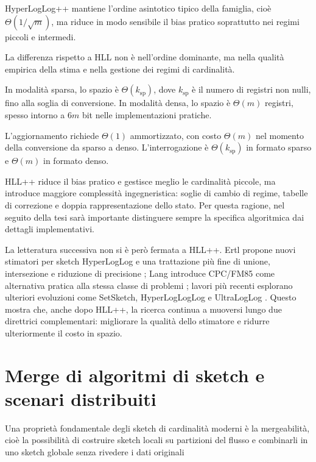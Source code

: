 HyperLogLog++ mantiene l'ordine asintotico tipico della famiglia, cioè
$\Theta(1/\sqrt{m})$, ma riduce in modo sensibile il bias pratico soprattutto
nei regimi piccoli e intermedi. 

La differenza rispetto a HLL non è nell'ordine
dominante, ma nella qualità empirica della stima e nella gestione dei regimi di
cardinalità.

In modalità sparsa, lo spazio è \(\Theta(k_{\text{sp}})\), dove $k_{\text{sp}}$ è il numero di registri non nulli,
fino alla soglia di conversione. In modalità densa, lo spazio è \(\Theta(m)\)
registri, spesso intorno a $6m$ bit nelle implementazioni pratiche.

L'aggiornamento richiede $\Theta(1)$ ammortizzato, con costo $\Theta(m)$ nel momento
della conversione da sparso a denso. L'interrogazione è
$\Theta(k_{\text{sp}})$ in formato sparso e $\Theta(m)$ in formato
denso.

HLL++ riduce il bias pratico e gestisce meglio le cardinalità piccole, ma
introduce maggiore complessità ingegneristica: soglie di cambio di regime,
tabelle di correzione e doppia rappresentazione dello stato. Per questa
ragione, nel seguito della tesi sarà importante distinguere sempre la specifica
algoritmica dai dettagli implementativi.

La letteratura successiva non si è però fermata a HLL++. Ertl propone nuovi
stimatori per sketch HyperLogLog e una trattazione più fine di unione,
intersezione e riduzione di precisione \cite{Ertl_2017_HLLAlgorithms}; Lang
introduce CPC/FM85 come alternativa pratica alla stessa classe di problemi
\cite{Lang_2017_CPC}; lavori più recenti esplorano ulteriori evoluzioni come
SetSketch, HyperLogLogLog e UltraLogLog
\cite{Ertl_2021_SetSketch,Karppa_Pagh_2022_HyperLogLogLog,Ertl_2024_UltraLogLog}.
Questo mostra che, anche dopo HLL++, la ricerca continua a muoversi lungo due
direttrici complementari: migliorare la qualità dello stimatore e ridurre
ulteriormente il costo in spazio.

\section{Merge di algoritmi di sketch e scenari distribuiti}
Una proprietà fondamentale degli sketch di cardinalità moderni è la
mergeabilità, cioè la possibilità di costruire sketch locali su partizioni del
flusso e combinarli in uno sketch globale senza rivedere i dati originali
\cite{Gibbons_Tirthapura_2001,Beyer_Haas_Reinwald_Sismanis_Gemulla_2007,Agarwal_Cormode_Huang_Phillips_Wei_Yi_2012}

